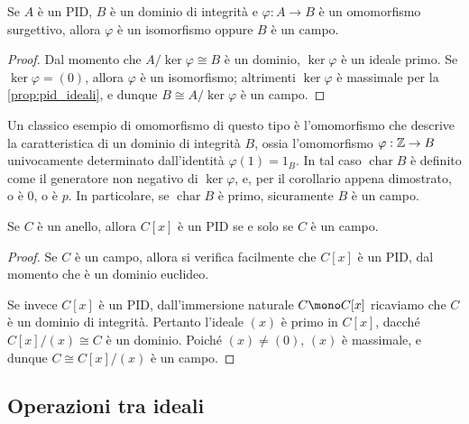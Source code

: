 \documentclass[11pt]{scrartcl}
\begin{document}
	\begin{corollary}
		Se $A$ è un PID, $B$ è un dominio di integrità e
		$\varphi: A \longrightarrow B$ è un omomorfismo surgettivo,
		allora $\varphi$ è un isomorfismo
		oppure $B$ è un campo. 
	\end{corollary}
	
	\begin{proof}
		Dal momento che $A / \ker \varphi \cong B$ è un dominio, $\ker \varphi$
		è un ideale primo. Se $\ker \varphi = (0)$, allora $\varphi$ è un
		isomorfismo; altrimenti $\ker \varphi$ è massimale per la
		\autoref{prop:pid_ideali}, e dunque $B \cong A / \ker \varphi$ è
		un campo.
	\end{proof}
	
	\begin{example}
		Un classico esempio di omomorfismo di questo tipo è l'omomorfismo che
		descrive la caratteristica di un dominio di integrità $B$, ossia
		l'omomorfismo
		$\varphi : \mathbb Z \to B$ univocamente determinato dall'identità
		$\varphi(1) = 1_B$. In tal caso $\operatorname{char} B$ è definito come il generatore
		non negativo di $\ker \varphi$, e, per il corollario appena dimostrato,
		o è $0$, o è $p$. In particolare, se $\operatorname{char} B$ è primo,
		sicuramente $B$ è un campo.
	\end{example}
	
	\begin{corollary}
		Se $C$ è un anello, allora $C[x]$ è un PID se e solo se $C$ è un campo.
	\end{corollary}
	
	\begin{proof}
		Se $C$ è un campo, allora si verifica facilmente che $C[x]$ è un PID,
		dal momento che è un dominio euclideo. \medskip
		
		Se invece $C[x]$ è un PID,
		dall'immersione naturale $C \mono C[x]$ ricaviamo che $C$ è un dominio di integrità. Pertanto
		l'ideale $(x)$ è primo in $C[x]$, dacché $C[x] / (x) \cong C$
		è un dominio. Poiché $(x) \neq (0)$, $(x)$ è massimale, e dunque
		$C \cong C[x] / (x)$ è un campo.
	\end{proof}
	
	\newpage
	
	\subsection{Operazioni tra ideali}
	
\end{document}
